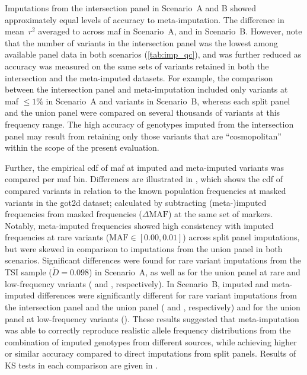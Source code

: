 Imputations from the intersection panel in Scenario~A and B showed approximately equal levels of accuracy to meta-imputation.
The difference in mean~$r^2$ averaged to  across \gls{maf} in Scenario~A, and  in Scenario~B.
However, note that the number of variants in the intersection panel was the lowest among available panel data in both scenarios (\cref{tab:imp_qc}), and was further reduced as accuracy was measured on the same sets of variants retained in both the intersection and the meta-imputed datasets.
For example, the comparison between the intersection panel and meta-imputation included only  variants at \gls{maf} ${\leq 1\%}$ in Scenario~A and  variants in Scenario~B, whereas each split panel and the union panel were compared on several thousands of variants at this frequency range.
The high accuracy of genotypes imputed from the intersection panel may result from retaining only those variants that are ``cosmopolitan'' within the scope of the present evaluation.


%

%

Further, the empirical \gls{cdf} of \gls{maf} at imputed and meta-imputed variants was compared per \gls{maf} bin.
Differences are illustrated in , which shows the \gls{cdf} of compared variants in relation to the known population frequencies at masked variants in the \gls{got2d} dataset; calculated by subtracting (meta-)imputed frequencies from masked frequencies (${\Delta\text{MAF}}$) at the same set of markers.
Notably, meta-imputed frequencies showed high consistency with imputed frequencies at rare variants (${\text{MAF} \in \left[ 0.00, 0.01\right]}$) across split panel imputations, but were skewed in comparison to imputations from the union panel in both scenarios.
Significant differences were found for rare variant imputations from the TSI sample (${\widetilde{D}=0.098}$) in Scenario~A, as well as for the union panel at rare and low-frequency variants ( and , respectively).
In Scenario~B, imputed and meta-imputed differences were significantly different for rare variant imputations from the intersection panel and the union panel ( and , respectively) and for the union panel at low-frequency variants ().
These results suggested that meta-imputation was able to correctly reproduce realistic allele frequency distributions from the combination of imputed genotypes from different sources, while achieving higher or similar accuracy compared to direct imputations from split panels.
Results of KS tests in each comparison are given in .


